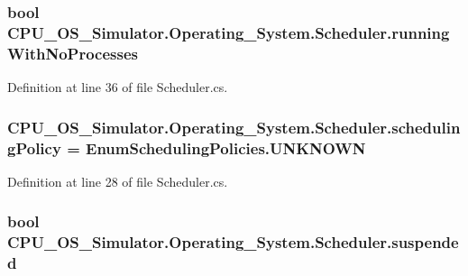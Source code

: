 \subsubsection[{running\+With\+No\+Processes}]{\setlength{\rightskip}{0pt plus 5cm}bool C\+P\+U\+\_\+\+O\+S\+\_\+\+Simulator.\+Operating\+\_\+\+System.\+Scheduler.\+running\+With\+No\+Processes\hspace{0.3cm}{\ttfamily [private]}}\label{class_c_p_u___o_s___simulator_1_1_operating___system_1_1_scheduler_af3276e8686d9efa7f8da6e48257922e3}


Definition at line 36 of file Scheduler.\+cs.

\hypertarget{class_c_p_u___o_s___simulator_1_1_operating___system_1_1_scheduler_a5a0194d8bb0127f6a8c010241d9ccb42}{}
\subsubsection[{scheduling\+Policy}]{ C\+P\+U\+\_\+\+O\+S\+\_\+\+Simulator.\+Operating\+\_\+\+System.\+Scheduler.\+scheduling\+Policy = {\bf Enum\+Scheduling\+Policies.\+U\+N\+K\+N\+O\+W\+N}\hspace{0.3cm}{\ttfamily [private]}}\label{class_c_p_u___o_s___simulator_1_1_operating___system_1_1_scheduler_a5a0194d8bb0127f6a8c010241d9ccb42}


Definition at line 28 of file Scheduler.\+cs.

\hypertarget{class_c_p_u___o_s___simulator_1_1_operating___system_1_1_scheduler_a844b64fe6c3917f055b61c4620995b74}{}
\subsubsection[{suspended}]{\setlength{\rightskip}{0pt plus 5cm}bool C\+P\+U\+\_\+\+O\+S\+\_\+\+Simulator.\+Operating\+\_\+\+System.\+Scheduler.\+suspended\hspace{0.3cm}{\ttfamily [private]}}\label{class_c_p_u___o_s___simulator_1_1_operating___system_1_1_scheduler_a844b64fe6c3917f055b61c4620995b74}


